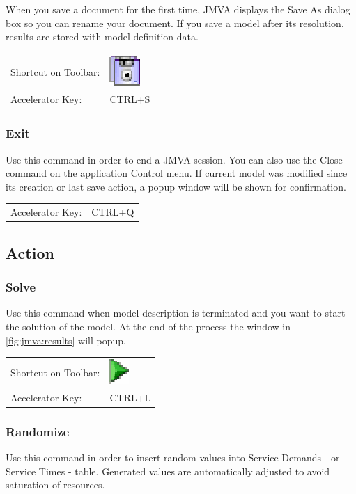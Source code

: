 When you save a document for the first time, JMVA displays the Save
As dialog box so you can rename your document. If you save a model
after its resolution, results are stored with model definition data.

\noindent
\begin{tabular}{ll}
Shortcut on Toolbar: & \includegraphics[scale=.8]{img/jmva/save}\\
Accelerator Key: & CTRL+S
\end{tabular}

\subsubsection{Exit}
Use this command in order to end a JMVA session. You can also use
the Close command on the application Control menu. If current model
was modified since its creation or last save action, a popup window
will be shown for confirmation.

\noindent
\begin{tabular}{ll}
\\
Accelerator Key: & CTRL+Q
\end{tabular}

\subsection{Action}
\subsubsection{Solve}
Use this command when model description is terminated and you want
to start the solution of the model. At the end of the process the
window in \autoref{fig:jmva:results} will popup.

\noindent
\begin{tabular}{ll}
Shortcut on Toolbar: & \includegraphics[scale=.8]{img/jmva/solve}\\
Accelerator Key: & CTRL+L
\end{tabular}

\subsubsection{Randomize}
Use this command in order to insert random values into Service
Demands - or Service Times - table. Generated values are
automatically adjusted to avoid saturation of resources.


